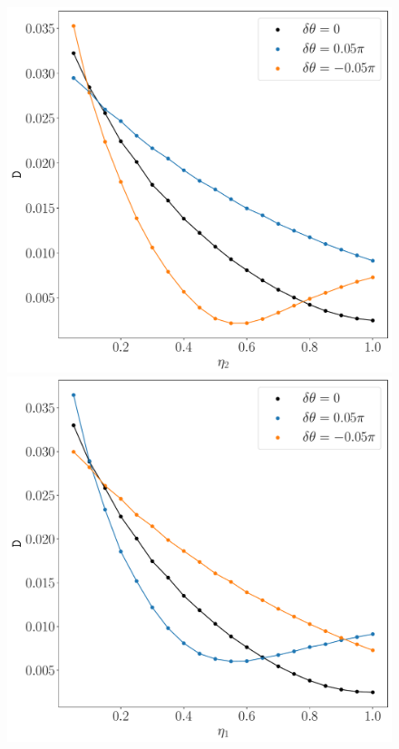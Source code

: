 \begin{figure}
    \centering
    \begin{minipage}[c]{.45\linewidth}
\includegraphics[width=\linewidth]{pics/homodyne/full1.pdf}
        \end{minipage}
\hfill
        \begin{minipage}[c]{.45\linewidth}
 \includegraphics[width=\linewidth]{pics/homodyne/full2.pdf}

\end{minipage}
\end{figure}
